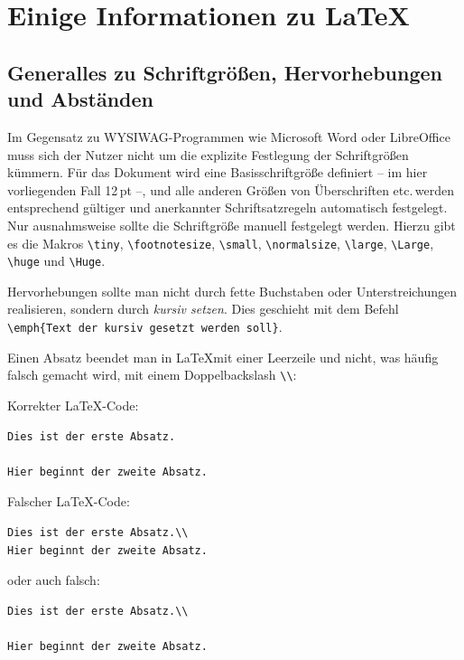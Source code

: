 \documentclass[arbeit=studie,oneside,BCOR=12mm]{ArbeitRST}
\begin{document}
\chapter{Einige Informationen zu \LaTeX}

\section{Generalles zu Schriftgrößen, Hervorhebungen und Abständen}
Im Gegensatz zu WYSIWAG-Programmen wie Microsoft Word oder LibreOffice muss sich der Nutzer nicht um die explizite Festlegung der Schriftgrößen kümmern. Für das Dokument wird eine Basisschriftgröße definiert -- im hier vorliegenden Fall 12\,pt --, und alle anderen Größen von Überschriften etc.\,werden entsprechend gültiger und anerkannter Schriftsatzregeln automatisch festgelegt. Nur ausnahmsweise sollte die Schriftgröße manuell festgelegt werden. Hierzu gibt es die Makros \texttt{\textbackslash tiny}, \texttt{\textbackslash footnotesize}, \texttt{\textbackslash small}, \texttt{\textbackslash normalsize}, \texttt{\textbackslash large}, \texttt{\textbackslash Large}, \texttt{\textbackslash huge} und \texttt{\textbackslash Huge}.

Hervorhebungen sollte man nicht durch fette Buchstaben oder Unterstreichungen realisieren, sondern durch \emph{kursiv setzen}. Dies geschieht mit dem Befehl \texttt{\textbackslash emph\{Text der kursiv gesetzt werden soll\}}. 

Einen Absatz beendet man in \LaTeX mit einer Leerzeile und nicht, was häufig falsch gemacht wird, mit einem Doppelbackslash \texttt{\textbackslash \textbackslash}:

\begin{minipage}[t]{0.5\linewidth}
Korrekter \LaTeX-Code:
\begin{verbatim}
Dies ist der erste Absatz.

Hier beginnt der zweite Absatz.
\end{verbatim}
\end{minipage}
\begin{minipage}[t]{0.5\linewidth}
Falscher \LaTeX-Code:
\begin{verbatim}
Dies ist der erste Absatz.\\
Hier beginnt der zweite Absatz.
\end{verbatim}
oder auch falsch:
\begin{verbatim}
Dies ist der erste Absatz.\\

Hier beginnt der zweite Absatz.
\end{verbatim}
\end{minipage}
\end{document}
